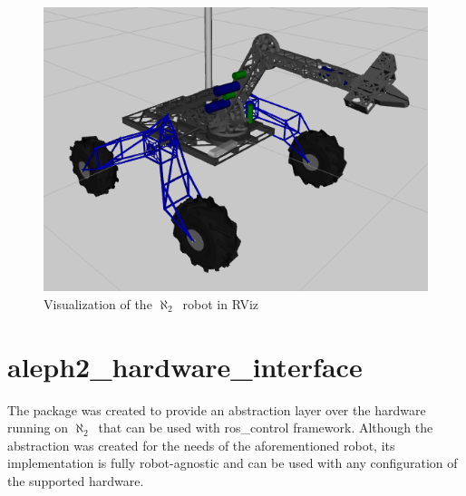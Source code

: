\documentclass[english,inz,shortabstract]{iithesis}
\newcommand{\rovername}{$\aleph_2$\ }
\begin{document}
	\begin{figure}[H]
		\centering
		\captionsetup{margin=2cm}
		\includegraphics[width=\textwidth]{img/description_rviz.png}
		\caption{Visualization of the \rovername robot in RViz}
		\label{fig:description_rviz}
	\end{figure}


\section{aleph2\_hardware\_interface}
The package was created to provide an abstraction layer over the hardware running on \rovername that can be used with \textsf{ros\_control} framework. Although the abstraction was created for the needs of the aforementioned robot, its implementation is fully robot-agnostic and can be used with any configuration of the supported hardware.
\end{document}
